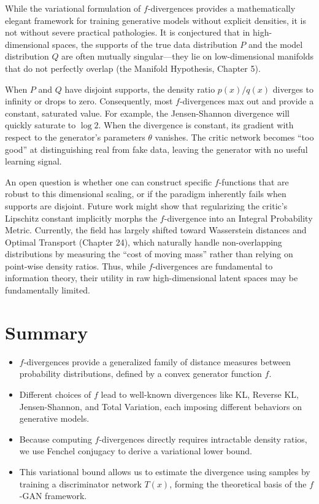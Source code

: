\begin{horizon}
While the variational formulation of $f$-divergences provides a mathematically elegant framework for training generative models without explicit densities, it is not without severe practical pathologies. It is conjectured that in high-dimensional spaces, the supports of the true data distribution $P$ and the model distribution $Q$ are often mutually singular---they lie on low-dimensional manifolds that do not perfectly overlap (the Manifold Hypothesis, Chapter 5). 

When $P$ and $Q$ have disjoint supports, the density ratio $p(x)/q(x)$ diverges to infinity or drops to zero. Consequently, most $f$-divergences max out and provide a constant, saturated value. For example, the Jensen-Shannon divergence will quickly saturate to $\log 2$. When the divergence is constant, its gradient with respect to the generator's parameters $\theta$ vanishes. The critic network becomes ``too good'' at distinguishing real from fake data, leaving the generator with no useful learning signal.

An open question is whether one can construct specific $f$-functions that are robust to this dimensional scaling, or if the paradigm inherently fails when supports are disjoint. Future work might show that regularizing the critic's Lipschitz constant implicitly morphs the $f$-divergence into an Integral Probability Metric. Currently, the field has largely shifted toward Wasserstein distances and Optimal Transport (Chapter 24), which naturally handle non-overlapping distributions by measuring the ``cost of moving mass'' rather than relying on point-wise density ratios. Thus, while $f$-divergences are fundamental to information theory, their utility in raw high-dimensional latent spaces may be fundamentally limited.
\end{horizon}

\section*{Summary}
\begin{itemize}
    \item $f$-divergences provide a generalized family of distance measures between probability distributions, defined by a convex generator function $f$.
    \item Different choices of $f$ lead to well-known divergences like KL, Reverse KL, Jensen-Shannon, and Total Variation, each imposing different behaviors on generative models.
    \item Because computing $f$-divergences directly requires intractable density ratios, we use Fenchel conjugacy to derive a variational lower bound.
    \item This variational bound allows us to estimate the divergence using samples by training a discriminator network $T(x)$, forming the theoretical basis of the $f$-GAN framework.
\end{itemize}

